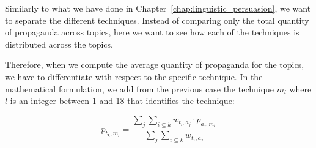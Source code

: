 Similarly to what we have done in Chapter~\ref{chap:linguistic_persuasion}, we want to separate the different techniques. Instead of comparing only the total quantity of propaganda across topics, here we want to see how each of the techniques is distributed across the topics. 

Therefore, when we compute the average quantity of propaganda for the topics, we have to differentiate with respect to the specific technique. In the mathematical formulation, we add from the previous case the technique $m_{l}$ where $l$ is an integer between 1 and 18 that identifies the technique:

$$ p_{t_{k},m_{l}} = \frac{ \sum_{j} \sum_{i\subseteq k} w_{t_{i},a_{j}} \cdot p_{a_{j},m_{l}} }{ \sum_{j} \sum_{i\subseteq k} w_{t_{i},a_{j}} } $$


\begin{figure}[!htbp]
    \centering
    
    


\end{figure}

